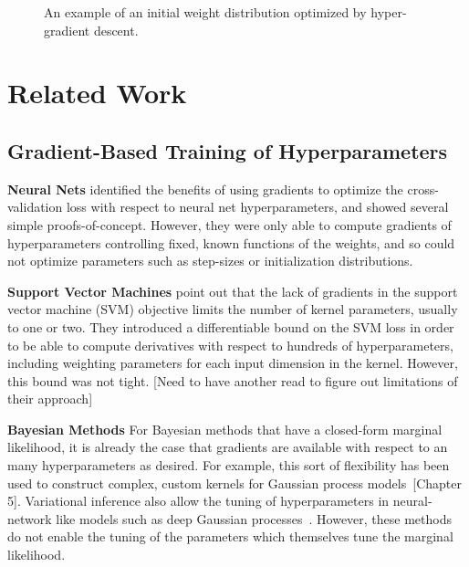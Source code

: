 \documentclass{article}
\begin{document}
\begin{figure}[ht]
\vskip 0.2in
\begin{center}
\caption{An example of an initial weight distribution optimized by hyper-gradient descent.}
\label{fig:optimal schedule}
\end{center}
\vskip -0.2in
\end{figure} 


\section{Related Work}

\subsection{Gradient-Based Training of Hyperparameters}
\textbf{Neural Nets}
\citet{bengio2000gradient, larsen1998adaptive} identified the benefits of using gradients to optimize the cross-validation loss with respect to neural net hyperparameters, and showed several simple proofs-of-concept.
However, they were only able to compute gradients of hyperparameters controlling fixed, known functions of the weights, and so could not optimize parameters such as step-sizes or initialization distributions.

\textbf{Support Vector Machines}
\citet{chapelle2002choosing} point out that the lack of gradients in the support vector machine (SVM) objective limits the number of kernel parameters, usually to one or two.
They introduced a differentiable bound on the SVM loss in order to be able to compute derivatives with respect to hundreds of hyperparameters, including weighting parameters for each input dimension in the kernel.
However, this bound was not tight. [Need to have another read to figure out limitations of their approach]

\textbf{Bayesian Methods}
For Bayesian methods that have a closed-form marginal likelihood, it is already the case that gradients are available with respect to an many hyperparameters as desired.
For example, this sort of flexibility has been used to construct complex, custom kernels for Gaussian process models~\cite{rasmussen38gaussian}[Chapter 5].
Variational inference also allow the tuning of hyperparameters in neural-network like models such as deep Gaussian processes~\citep{deepGPVar14}.
However, these methods do not enable the tuning of the parameters which themselves tune the marginal likelihood.
\end{document}
